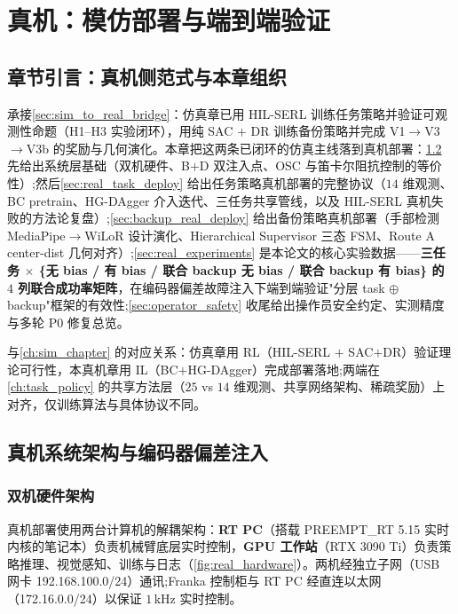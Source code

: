 
\chapter{真机：模仿部署与端到端验证}\label{ch:real_chapter}

\section{章节引言：真机侧范式与本章组织}\label{sec:real_intro}

承接\cref{sec:sim_to_real_bridge}：仿真章已用 HIL-SERL 训练任务策略并验证可观测性命题（H1–H3 实验闭环），用纯 SAC $+$ DR 训练备份策略并完成 V1$\to$V3$\to$V3b 的奖励与几何演化。本章把这两条已闭环的仿真主线落到真机部署：\cref{sec:real_arch} 先给出系统层基础（双机硬件、B$+$D 双注入点、OSC 与笛卡尔阻抗控制的等价性）;然后\cref{sec:real_task_deploy} 给出任务策略真机部署的完整协议（$14$ 维观测、BC pretrain、HG-DAgger 介入迭代、三任务共享管线，以及 HIL-SERL 真机失败的方法论复盘）;\cref{sec:backup_real_deploy} 给出备份策略真机部署（手部检测 MediaPipe$\to$WiLoR 设计演化、Hierarchical Supervisor 三态 FSM、Route A center-dist 几何对齐）;\cref{sec:real_experiments} 是本论文的核心实验数据——\textbf{三任务 $\times$ \{无 bias / 有 bias / 联合 backup 无 bias / 联合 backup 有 bias\} 的 $4$ 列联合成功率矩阵}，在编码器偏差故障注入下端到端验证"分层 task $\oplus$ backup"框架的有效性;\cref{sec:operator_safety} 收尾给出操作员安全约定、实测精度与多轮 P0 修复总览。

与\cref{ch:sim_chapter} 的对应关系：仿真章用 RL（HIL-SERL $+$ SAC$+$DR）验证理论可行性，本真机章用 IL（BC$+$HG-DAgger）完成部署落地;两端在\cref{ch:task_policy} 的共享方法层（$25$ vs $14$ 维观测、共享网络架构、稀疏奖励）上对齐，仅训练算法与具体协议不同。

\section{真机系统架构与编码器偏差注入}\label{sec:real_arch}

\subsection{双机硬件架构}\label{subsec:hardware}

真机部署使用两台计算机的解耦架构：\textbf{RT PC}（搭载 PREEMPT\_RT 5.15 实时内核的笔记本）负责机械臂底层实时控制，\textbf{GPU 工作站}（RTX 3090 Ti）负责策略推理、视觉感知、训练与日志（\cref{fig:real_hardware}）。两机经独立子网（USB 网卡 192.168.100.0/24）通讯;Franka 控制柜与 RT PC 经直连以太网（172.16.0.0/24）以保证 $1$\,kHz 实时控制。

